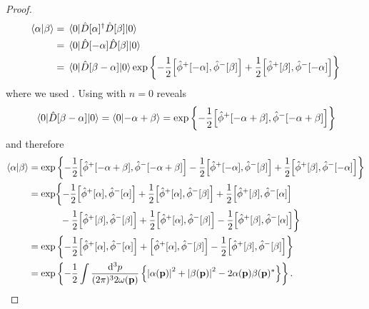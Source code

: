 \begin{proof}
	\begin{equation*}
		\begin{split}
			\braket{\alpha}{\beta}
			&=
			\expval{
				\hat{D}[\alpha]^\dagger
				\hat{D}[\beta]
			}{0}
			\\
			&=
			\expval{
				\hat{D}[-\alpha]
				\hat{D}[\beta]
			}{0}
			\\
			&=
			\expval{
				\hat{D}[\beta-\alpha]
			}{0}
			\exp\left\{
				-
				\frac{1}{2}
				\comm{\hat\phi^+[-\alpha]}{\hat\phi^-[\beta]}
				+
				\frac{1}{2}
				\comm{\hat\phi^+[\beta]}{\hat\phi^-[-\alpha]}
			\right\}
		\end{split}
	\end{equation*}
	where we used .
	Using  with $n=0$ reveals
	\begin{equation*}
		\expval{\hat{D}[\beta-\alpha]}{0}
		=
		\braket{0}{-\alpha+\beta}
		=
		\exp\left\{
			-
			\frac{1}{2}
			\comm{\hat\phi^+[-\alpha+\beta]}{\hat\phi^-[-\alpha+\beta]}
		\right\}
	\end{equation*}
	and therefore
	\begin{equation*}
		\begin{split}
			\braket{\alpha}{\beta}
			&=
			\exp\left\{
				-
				\frac{1}{2}
				\comm{\hat\phi^+[-\alpha+\beta]}{\hat\phi^-[-\alpha+\beta]}
				-
				\frac{1}{2}
				\comm{\hat\phi^+[-\alpha]}{\hat\phi^-[\beta]}
				+
				\frac{1}{2}
				\comm{\hat\phi^+[\beta]}{\hat\phi^-[-\alpha]}
			\right\}
			\\
			&=
			\exp\biggl\{
				-
				\frac{1}{2}
				\comm{\hat\phi^+[\alpha]}{\hat\phi^-[\alpha]}
				+
				\frac{1}{2}
				\comm{\hat\phi^+[\alpha]}{\hat\phi^-[\beta]}
				+
				\frac{1}{2}
				\comm{\hat\phi^+[\beta]}{\hat\phi^-[\alpha]}
				\\
				&\ \ \ \ \ \ \ \ \ \
				-
				\frac{1}{2}
				\comm{\hat\phi^+[\beta]}{\hat\phi^-[\beta]}
				+
				\frac{1}{2}
				\comm{\hat\phi^+[\alpha]}{\hat\phi^-[\beta]}
				-
				\frac{1}{2}
				\comm{\hat\phi^+[\beta]}{\hat\phi^-[\alpha]}
			\biggr\}
			\\
			&=
			\exp\left\{
				-
				\frac{1}{2}
				\comm{\hat\phi^+[\alpha]}{\hat\phi^-[\alpha]}
				+
				\comm{\hat\phi^+[\alpha]}{\hat\phi^-[\beta]}
				-
				\frac{1}{2}
				\comm{\hat\phi^+[\beta]}{\hat\phi^-[\beta]}
			\right\}
			\\
			&=
			\exp\left\{
				-
				\frac{1}{2}
				\int\frac{\dd[3]{p}}{(2\pi)^32\omega(\vb{p})}
				\left\{
					\abs{\alpha(\vb{p})}^2
					+
					\abs{\beta(\vb{p})}^2
					-
					2\alpha(\vb{p})\beta(\vb{p})^*
				\right\}
			\right\}
			.
		\end{split}
	\end{equation*}
\end{proof}